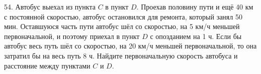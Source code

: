 54. Автобус выехал из пункта $C$ в пункт $D.$ Проехав половину пути и ещё 40 км с постоянной скоростью, автобус остановился для ремонта, который занял 50 мин.  Оставшуюся часть пути автобус шёл со скоростью, на 5 км/ч меньшей первоначальной, и поэтому приехал в пункт $D$ с опозданием на 1 ч. Если бы автобус весь путь шёл со скоростью, на 20 км/ч меньшей первоначальной, то она затратил бы на весь путь 8 ч. Найдите первоначальную скорость автобуса и расстояние между пунктами $C$ и $D.$\\

